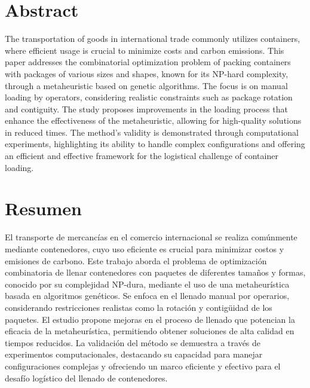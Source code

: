 \documentclass[openany]{article}
\begin{document}
\clearpage\thispagestyle{empty}\null\newpage %

\newpage
\thispagestyle{plain}

\section*{Abstract}

The transportation of goods in international trade commonly utilizes containers, where efficient usage is crucial to minimize costs and carbon emissions. This paper addresses the combinatorial optimization problem of packing containers with packages of various sizes and shapes, known for its NP-hard complexity, through a metaheuristic based on genetic algorithms. The focus is on manual loading by operators, considering realistic constraints such as package rotation and contiguity. The study proposes improvements in the loading process that enhance the effectiveness of the metaheuristic, allowing for high-quality solutions in reduced times. The method's validity is demonstrated through computational experiments, highlighting its ability to handle complex configurations and offering an efficient and effective framework for the logistical challenge of container loading.

\vspace{2cm}

\section*{Resumen}

El transporte de mercancías en el comercio internacional se realiza comúnmente mediante contenedores, cuyo uso eficiente es crucial para minimizar costos y emisiones de carbono. Este trabajo aborda el problema de optimización combinatoria de llenar contenedores con paquetes de diferentes tamaños y formas, conocido por su complejidad NP-dura, mediante el uso de una metaheurística basada en algoritmos genéticos. Se enfoca en el llenado manual por operarios, considerando restricciones realistas como la rotación y contigüidad de los paquetes. El estudio propone mejoras en el proceso de llenado que potencian la eficacia de la metaheurística, permitiendo obtener soluciones de alta calidad en tiempos reducidos. La validación del método se demuestra a través de experimentos computacionales, destacando su capacidad para manejar configuraciones complejas y ofreciendo un marco eficiente y efectivo para el desafío logístico del llenado de contenedores.
\end{document}
